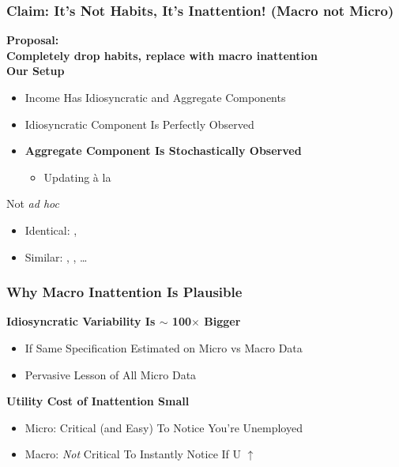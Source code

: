 \documentclass{beamer}\usepackage{dcolumn}
\newcommand{\jbemph}[1]{\textbf{\color{SlideNavy}#1}}
\begin{document}
\begin{frame}
\frametitle{Claim: It's Not Habits, It's Inattention! (Macro not Micro)}
\jbemph{\large Proposal:\\ Completely drop habits, replace with macro inattention}\\[4mm]
\jbemph{\large Our Setup}
\begin{itemize}
\item   Income Has Idiosyncratic and Aggregate Components
\item   Idiosyncratic Component Is Perfectly Observed
\item   \jbemph{Aggregate Component Is Stochastically Observed}\\
  \begin{itemize}
\item Updating \`a la \cite{calvoPrices}
  \end{itemize}

\end{itemize}
\begin{block}{ Not {\em ad hoc}}
\begin{itemize}
\item Identical: \cite{mrSlumps}, \cite{carroll:epidemicinflQJE}
\item Similar: \cite{reis:inattentive}, \cite{simsInattention},   \dots
\end{itemize}
\end{block}

\end{frame}



\begin{frame}
\frametitle{Why Macro Inattention Is Plausible}

\begin{block}{\textbf{Idiosyncratic Variability Is $\sim$ 100$\times$ Bigger}}
\begin{itemize}
\item  If Same Specification Estimated on Micro vs Macro Data
\item  Pervasive Lesson of All Micro Data
\end{itemize}
\end{block}

\begin{block}{\textbf{Utility Cost of Inattention Small}}
\begin{itemize}
\item  Micro: Critical (and Easy) To Notice You're Unemployed
\item  Macro: {\it Not} Critical To Instantly Notice If U $\uparrow$
\end{itemize}
\end{block}
\end{frame}
\end{document}
